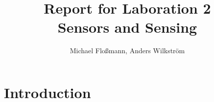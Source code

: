\documentclass{article}
\title{Report for Laboration 2\\Sensors and Sensing}
\author{Michael Flo{\ss}mann, Anders Wilkstr\"om}
\begin{document}
\maketitle
\section{Introduction}
\end{document}
